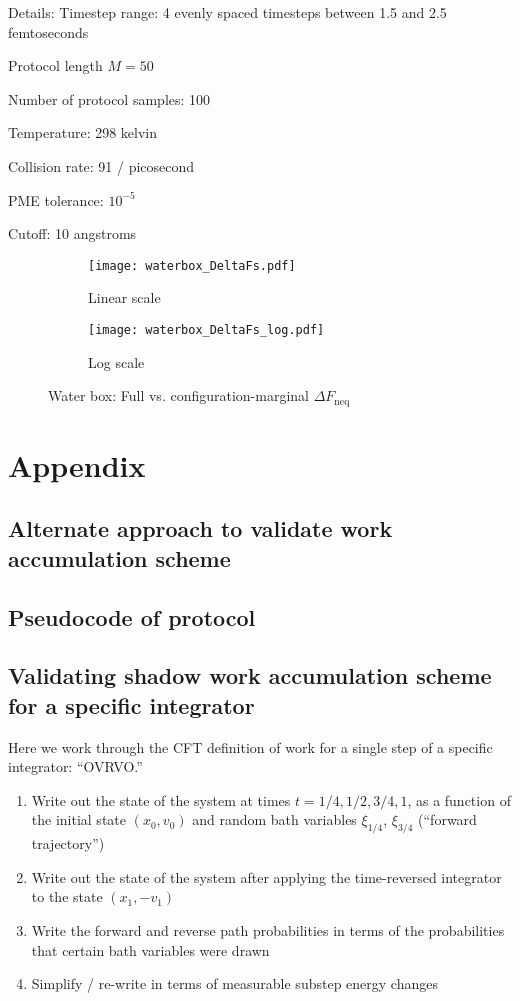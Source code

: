\documentclass[11pt]{article}
\begin{document}
Details:
Timestep range: 4 evenly spaced timesteps between 1.5 and 2.5 femtoseconds

Protocol length $M=50$

Number of protocol samples: 100

Temperature: 298 kelvin

Collision rate: 91 / picosecond

PME tolerance: $10^{-5}$

Cutoff: 10 angstroms

\graphicspath{{/Users/joshuafass/Documents/Code/integrator-benchmark/figures/}}

\begin{figure}[h] 
\centering
	\begin{subfigure}[b]{0.3\textwidth}
		\texttt{[image: waterbox\_DeltaFs.pdf]}
		\caption{Linear scale}
	\end{subfigure}
	\begin{subfigure}[b]{0.3\textwidth}
		\texttt{[image: waterbox\_DeltaFs\_log.pdf]}
		\caption{Log scale}
	\end{subfigure}
	\caption{Water box: Full vs. configuration-marginal $\Delta F_\text{neq}$}
\end{figure}

\section{Appendix}
\subsection{Alternate approach to validate work accumulation scheme}


\subsection{Pseudocode of protocol}

\subsection{Validating shadow work accumulation scheme for a specific integrator}
Here we work through the CFT definition of work for a single step of a specific integrator: ``OVRVO.''
\begin{enumerate}
\item Write out the state of the system at times $t=1/4, 1/2, 3/4, 1$, as a function of the initial state $(x_0, v_0)$ and random bath variables $\xi_{1/4}$, $\xi_{3/4}$ (``forward trajectory'')
\item Write out the state of the system after applying the time-reversed integrator to the state $(x_1, -v_1)$
\item Write the forward and reverse path probabilities in terms of the probabilities that certain bath variables were drawn
\item Simplify / re-write in terms of measurable substep energy changes
\end{enumerate}
\end{document}
